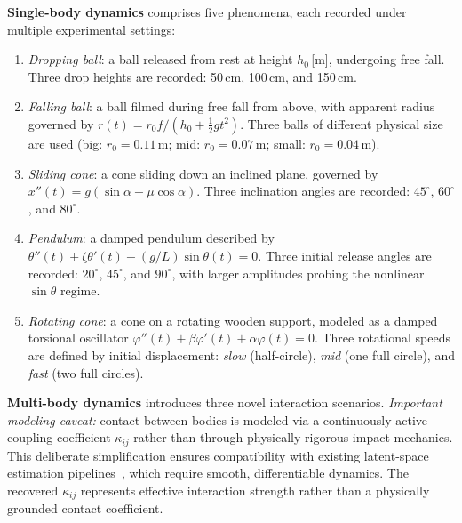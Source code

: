 \documentclass[runningheads]{llncs}
\begin{document}
\noindent
\textbf{Single-body dynamics} comprises five phenomena, each recorded under multiple experimental settings:
\begin{enumerate}
    \item \emph{Dropping ball}: a ball released from rest at height $h_0$\,[m], undergoing free fall. Three drop heights are recorded: 50\,cm, 100\,cm, and 150\,cm.
    \item \emph{Falling ball}: a ball filmed during free fall from above, with apparent radius governed by $r(t) = r_0 f / (h_0 + \tfrac{1}{2}g t^2)$. Three balls of different physical size are used (big: $r_0 = 0.11$\,m; mid: $r_0 = 0.07$\,m; small: $r_0 = 0.04$\,m).
    \item \emph{Sliding cone}: a cone sliding down an inclined plane, governed by $x''(t) = g(\sin\alpha - \mu\cos\alpha)$. Three inclination angles are recorded: $45^\circ$, $60^\circ$, and $80^\circ$.
    \item \emph{Pendulum}: a damped pendulum described by $\theta''(t) + \zeta\theta'(t) + (g/L)\sin\theta(t) = 0$. Three initial release angles are recorded: $20^\circ$, $45^\circ$, and $90^\circ$, with larger amplitudes probing the nonlinear $\sin\theta$ regime.
    \item \emph{Rotating cone}: a cone on a rotating wooden support, modeled as a damped torsional oscillator $\varphi''(t) + \beta\varphi'(t) + \alpha\varphi(t) = 0$. Three rotational speeds are defined by initial displacement: \emph{slow} (half-circle), \emph{mid} (one full circle), and \emph{fast} (two full circles).
\end{enumerate}

\noindent
\textbf{Multi-body dynamics} introduces three novel interaction scenarios. \emph{Important modeling caveat:} contact between bodies is modeled via a continuously active coupling coefficient $\kappa_{ij}$ rather than through physically rigorous impact mechanics. This deliberate simplification ensures compatibility with existing latent-space estimation pipelines~\cite{hofherr2023neural, jaques2019physics, garcia2025learning}, which require smooth, differentiable dynamics. The recovered $\kappa_{ij}$ represents effective interaction strength rather than a physically grounded contact coefficient.
\end{document}
